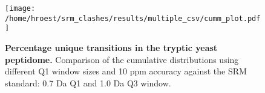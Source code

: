 \begin{figure}

\center
\texttt{[image: /home/hroest/srm\_clashes/results/multiple\_csv/cumm\_plot.pdf]}

\caption{ \textbf{Percentage unique transitions in the tryptic yeast peptidome.}
Comparison of the cumulative distributions using different Q1 window sizes and
10 ppm accuracy against the SRM standard: 0.7 Da Q1 and 1.0 Da Q3 window.}
\label{fig:400range.comp_cum_all}
\end{figure}





